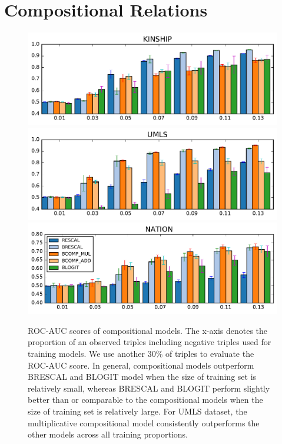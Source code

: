 
\section{Compositional Relations}

\begin{figure}[t]
	\centering
	\includegraphics[width=\linewidth]{images/comp_training_error_kinship_small.pdf}
	\includegraphics[width=\linewidth]{images/comp_training_error_umls_small.pdf}			
	\includegraphics[width=\linewidth]{images/comp_training_error_nation_small.pdf}				
	\caption{\label{fig:r_vs_br} ROC-AUC scores of compositional models. The x-axis denotes the proportion of an observed triples including negative triples used for training models. We  use another 30\% of triples to evaluate the ROC-AUC score. In general, compositional models outperform BRESCAL and BLOGIT model when the size of training set is relatively small, whereas BRESCAL and BLOGIT perform slightly better than or comparable to the compositional models when the size of training set is relatively large. For UMLS dataset, the multiplicative compositional model consistently outperforms the other models across all training proportions.}
\end{figure} 


